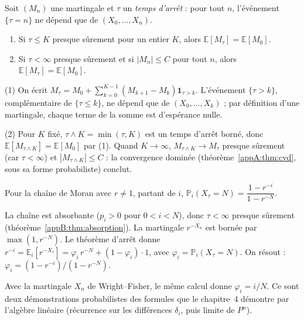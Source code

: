 \begin{theorem}\label{appB:thm:arret}
Soit $(M_n)$ une martingale et $\tau$ un \emph{temps d'arrêt} : pour tout $n$, l'événement $\{\tau=n\}$ ne dépend que de
$(X_0,\dots,X_n)$.
\begin{enumerate}
\item Si $\tau\le K$ presque sûrement pour un entier $K$, alors $\mathbb E[M_\tau]=\mathbb E[M_0]$.
\item Si $\tau<\infty$ presque sûrement et si $|M_n|\le C$ pour tout $n$, alors $\mathbb E[M_\tau]=\mathbb E[M_0]$.
\end{enumerate}
\end{theorem}

\begin{humanproof}
(1) On écrit $M_\tau=M_0+\sum_{k=0}^{K-1}(M_{k+1}-M_k)\mathbf 1_{\tau>k}$. L'événement $\{\tau>k\}$, complémentaire de
$\{\tau\le k\}$, ne dépend que de $(X_0,\dots,X_k)$ ; par définition d'une martingale, chaque terme de la somme est
d'espérance nulle.

(2) Pour $K$ fixé, $\tau\wedge K=\min(\tau,K)$ est un temps d'arrêt borné, donc $\mathbb E[M_{\tau\wedge
K}]=\mathbb E[M_0]$ par (1). Quand $K\to\infty$, $M_{\tau\wedge K}\to M_\tau$ presque sûrement (car $\tau<\infty$) et
$|M_{\tau\wedge K}|\le C$ : la convergence dominée (théorème~\ref{appA:thm:cvd}, sous sa forme probabiliste) conclut.
\end{humanproof}

\begin{corollary}\label{appB:cor:ruine}
Pour la chaîne de Moran avec $r\ne1$, partant de $i$, $\mathbb P_i(X_\tau=N)=\dfrac{1-r^{-i}}{1-r^{-N}}$.
\end{corollary}

\begin{humanproof}
La chaîne est absorbante ($p_i>0$ pour $0<i<N$), donc $\tau<\infty$ presque sûrement (théorème~\ref{appB:thm:absorption}).
La martingale $r^{-X_n}$ est bornée par $\max(1,r^{-N})$. Le théorème d'arrêt donne
$r^{-i}=\mathbb E_i[r^{-X_\tau}]=\varphi_i\,r^{-N}+(1-\varphi_i)\cdot1$, avec $\varphi_i=\mathbb P_i(X_\tau=N)$.
On résout : $\varphi_i=(1-r^{-i})/(1-r^{-N})$.
\end{humanproof}
Avec la martingale $X_n$ de Wright--Fisher, le même calcul donne $\varphi_i=i/N$. Ce sont deux démonstrations
probabilistes des formules que le chapitre~4 démontre par l'algèbre linéaire (récurrence sur les différences
$\delta_i$, puis limite de $P^n$).

